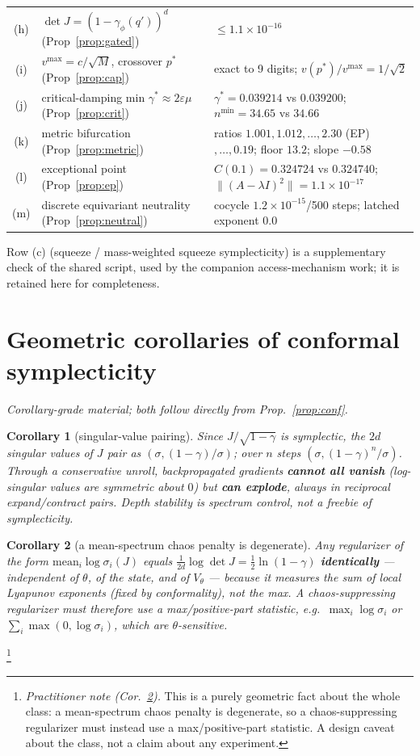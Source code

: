\documentclass[11pt]{article}
\theoremstyle{plain}
\newtheorem{corollary}{Corollary}
\theoremstyle{definition}
\newcommand{\half}{\tfrac12}
\begin{document}
\begin{center}
{\begin{tabular}{cll}
(h) & $\det J=(1-\gamma_\phi(q'))^d$ (Prop~\ref{prop:gated}) & $\le1.1\times10^{-16}$ \\
(i) & $v^{\max}=c/\sqrt M$, crossover $p^*$ (Prop~\ref{prop:cap}) & exact to 9 digits; $v(p^*)/v^{\max}=1/\sqrt2$ \\
(j) & critical-damping min $\gamma^*\approx2\varepsilon\mu$ (Prop~\ref{prop:crit}) & $\gamma^*=0.039214$ vs $0.039200$; $n^{\min}=34.65$ vs $34.66$ \\
(k) & metric bifurcation (Prop~\ref{prop:metric}) & ratios $1.001,1.012,\dots,2.30$ (EP)$,\dots,0.19$; floor $13.2$; slope $-0.58$ \\
(l) & exceptional point (Prop~\ref{prop:ep}) & $C(0.1)=0.324724$ vs $0.324740$; $\lVert(A-\lambda I)^2\rVert=1.1\times10^{-17}$ \\
(m) & discrete equivariant neutrality (Prop~\ref{prop:neutral}) & cocycle $1.2\times10^{-15}$/500 steps; latched exponent $0.0$ \\
\bottomrule
\end{tabular}}
\end{center}
Row (c) (squeeze / mass-weighted squeeze symplecticity) is a supplementary check of the shared script, used by the companion access-mechanism work; it is retained here for completeness.

\appendix
\section{Geometric corollaries of conformal symplecticity}\label{app:cor}
\emph{Corollary-grade material; both follow directly from Prop.~\ref{prop:conf}.}
\begin{corollary}[singular-value pairing]\label{cor:sv}
Since $J/\sqrt{1-\gamma}$ is symplectic, the $2d$ singular values of $J$ pair as $(\sigma,(1-\gamma)/\sigma)$; over $n$ steps $(\sigma,(1-\gamma)^n/\sigma)$. Through a conservative unroll, backpropagated gradients \textbf{cannot all vanish} (log-singular values are symmetric about $0$) but \textbf{can explode}, always in reciprocal expand/contract pairs. Depth stability is spectrum \emph{control}, not a freebie of symplecticity.
\end{corollary}
\begin{corollary}[a mean-spectrum chaos penalty is degenerate]\label{cor:mean}
Any regularizer of the form $\mathrm{mean}_i\log\sigma_i(J)$ equals $\tfrac{1}{2d}\log\det J=\half\ln(1-\gamma)$ \textbf{identically} --- independent of $\theta$, of the state, and of $V_\theta$ --- because it measures the \emph{sum} of local Lyapunov exponents (fixed by conformality), not the \emph{max}. A chaos-suppressing regularizer must therefore use a max/positive-part statistic, e.g.\ $\max_i\log\sigma_i$ or $\sum_i\max(0,\log\sigma_i)$, which are $\theta$-sensitive.
\end{corollary}
\footnote{\emph{Practitioner note (Cor.~\ref{cor:mean}).} This is a purely geometric fact about the whole class: a mean-spectrum chaos penalty is degenerate, so a chaos-suppressing regularizer must instead use a max/positive-part statistic. A design caveat about the class, not a claim about any experiment.}
\end{document}
